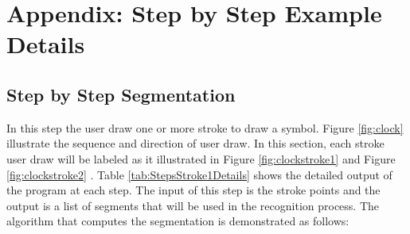 \chapter{Appendix: Step by Step Example Details}
\label{ChapterstepExample}%

\section{Step by Step Segmentation}
\label{apsec:stepseg}

In this step the user draw one or more stroke to draw a symbol. Figure \ref{fig:clock} illustrate the sequence and direction of user draw. In this section, each stroke user draw will be labeled as it illustrated in Figure \ref{fig:clockstroke1} and Figure \ref{fig:clockstroke2} . Table \ref{tab:StepsStroke1Details} shows the detailed output of the program at each step. The input of this step is the stroke points and the output is a list of segments that will be used in the recognition process. The algorithm that computes the segmentation is demonstrated as follows:


